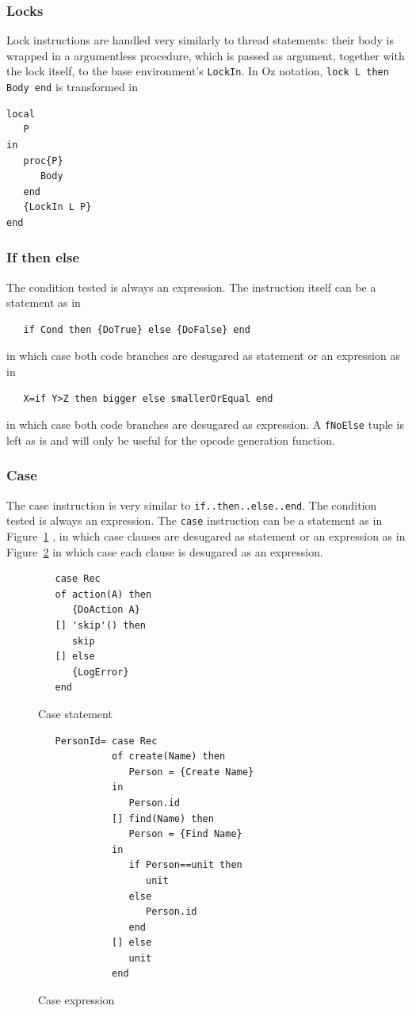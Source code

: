 \documentclass[a4paper]{memoir}
\begin{document}
\subsubsection{Locks}
Lock instructions are handled very similarly to thread statements: their body is
wrapped in a argumentless procedure, which is passed as argument, together with
the lock itself, to the base environment's \lstinline!LockIn!. In Oz notation, \lstinline!lock L then Body end! is transformed in
\begin{lstlisting}
local
   P
in
   proc{P}
      Body
   end
   {LockIn L P}
end
\end{lstlisting}


\subsubsection{If then else}
The condition tested is always an expression.
The instruction itself can be a statement as in 
\begin{lstlisting}
   if Cond then {DoTrue} else {DoFalse} end
\end{lstlisting}
in which case both code branches are desugared as statement
or an expression as in
\begin{lstlisting}
   X=if Y>Z then bigger else smallerOrEqual end
\end{lstlisting}
in which case both code branches are desugared as expression.
A \lstinline!fNoElse! tuple is left as is and will only be useful for the opcode generation function.

\subsubsection{Case}
The case instruction is very similar to \lstinline!if..then..else..end!.
The condition tested is always an expression.
The \lstinline!case! instruction can be a statement as in Figure~\ref{fig:casestat}
, in which case clauses are desugared as statement or an expression as in Figure~\ref{fig:caseexpr}
in which case each clause is desugared as an expression.
\begin{figure}[h]
\begin{lstlisting}
   case Rec
   of action(A) then
      {DoAction A}
   [] 'skip'() then
      skip
   [] else
      {LogError}
   end
\end{lstlisting}
\caption{Case statement}
\label{fig:casestat}
\end{figure}

\begin{figure}[h]
\begin{lstlisting}
   PersonId= case Rec
             of create(Name) then
                Person = {Create Name}
             in
                Person.id
             [] find(Name) then
                Person = {Find Name}
             in
                if Person==unit then
                   unit
                else
                   Person.id
                end
             [] else
                unit
             end
\end{lstlisting}
\caption{Case expression}
\label{fig:caseexpr}
\end{figure}
\end{document}
